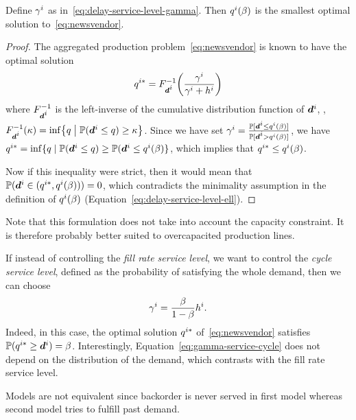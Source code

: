 \begin{prop}\label{prop:vendor}
Define $\gamma^i$ as in~\eqref{eq:delay-service-level-gamma}. Then $q^i(\beta)$ is the smallest optimal solution to~\eqref{eq:newsvendor}.
\end{prop}

\begin{proof}
The aggregated production problem~\eqref{eq:newsvendor} is known to have the optimal solution
$$\quantity^{i*} = F_{\va d^i}^{-1}\bracket{\frac{\backorder^i}{\backorder^i+h^i}}$$ where $F_{\va d^i}^{-1}$ is the left-inverse of the cumulative distribution function of $\va d^i$,
\ie, $F_{\va d^i}^{-1}(\kappa) = \inf\crbracket{ \quantity\; \big| \; \PP(\va d^i \leq \quantity) \geq \kappa}$.
Since we have set $\backorder^i=\frac{\PP[\va d^i\leq \quantity^i(\servicelvl)]}{\PP[\va d^i>\quantity^i(\servicelvl)]}$,
we have $\quantity^{i*}=\inf\{\quantity \; | \; \PP(\va d^i \leq \quantity) \geq \PP(\va d^i \leq \quantity^i(\beta) \}$, which implies that $q^{i*}\leq q^i(\beta)$.

Now if this inequality were strict, then it would mean that $\PP(\va\demand^i\in(\quantity^{i*},\quantity^i(\beta)))=0$, which contradicts the minimality assumption in the definition of $q^i(\beta)$ (Equation~\eqref{eq:delay-service-level-ell}).
\end{proof}

Note that this formulation does not take into account the capacity constraint. It is therefore probably better suited to overcapacited production lines.

\begin{rmq}
If instead of controlling the {\em fill rate service level}, we want to control the {\em cycle service level}, defined as the probability of satisfying the whole demand, then we can choose
\begin{equation}
\label{eq:gamma-service-cycle}
\gamma^i = \frac{\beta}{1-\beta} h^i.
\end{equation}
Indeed, in this case, the optimal solution $q^{i*}$ of~\eqref{eq:newsvendor} satisfies $\PP(\quantity^{i*} \geq \va d^i) = \servicelvl$. Interestingly, Equation~\eqref{eq:gamma-service-cycle} does not depend on the distribution of the demand, which contrasts with the fill rate service level.
\end{rmq}




\begin{rmq}
Models are not equivalent since backorder is never served in first model whereas second model tries to fulfill past demand. 
\end{rmq}


